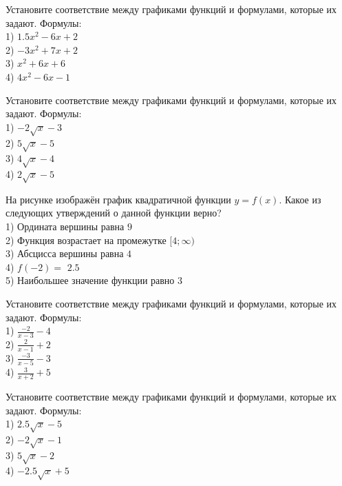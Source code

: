\documentclass[4apaper]{article}
\begin{document}
\begin{taskBN}{70}
Установите соответствие между графиками функций и формулами, которые их задают. Формулы: \\1) $1.5x^2-6x+2$\\2) $-3x^2+7x+2$\\3) $x^2+6x+6$\\4) $4x^2-6x-1$
\end{taskBN}

\begin{taskBN}{71}
Установите соответствие между графиками функций и формулами, которые их задают. Формулы: \\1) $-2\sqrt{x}-3$\\2) $5\sqrt{x}-5$\\3) $4\sqrt{x}-4$\\4) $2\sqrt{x}-5$
\end{taskBN}

\begin{taskBN}{72}
На рисунке изображён график квадратичной функции $y=f(x)$. Какое из следующих утверждений о данной функции верно?\\1) Ордината вершины равна $9$\\2) Функция возрастает на промежутке $[4; \infty)$\\3) Абсцисса вершины равна $4$\\4) $f(-2)=$ $2.5$\\5) Наибольшее значение функции равно  $3$
\end{taskBN}

\begin{taskBN}{73}
Установите соответствие между графиками функций и формулами, которые их задают. Формулы: \\1) $\frac{-2}{x-3}-4$\\2) $\frac{2}{x-1}+2$\\3) $\frac{-3}{x-5}-3$\\4) $\frac{3}{x+2}+5$
\end{taskBN}

\begin{taskBN}{74}
Установите соответствие между графиками функций и формулами, которые их задают. Формулы: \\1) $2.5\sqrt{x}-5$\\2) $-2\sqrt{x}-1$\\3) $5\sqrt{x}-2$\\4) $-2.5\sqrt{x}+5$
\end{taskBN}
\end{document}
